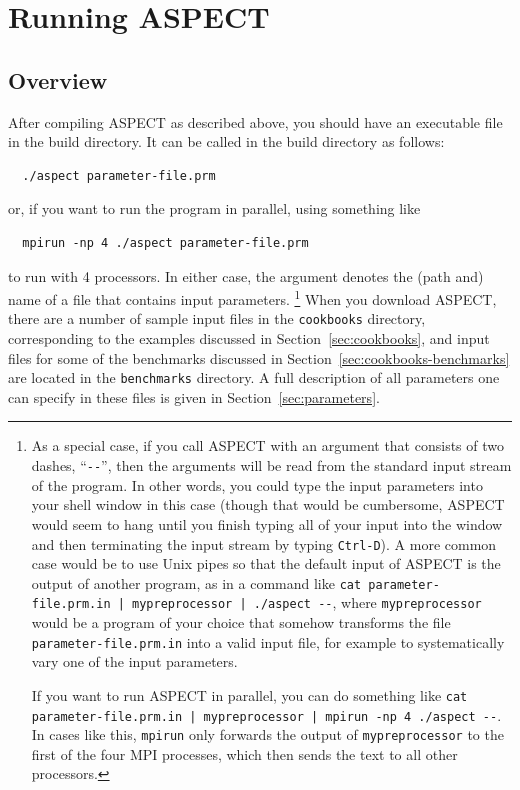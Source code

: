 \documentclass{article}
\newcommand{\aspect}{\textsc{ASPECT}}
\begin{document}

\section{Running \aspect}
\label{sec:running}

\subsection{Overview}
\label{sec:running-overview}

After compiling \aspect{} as described above, you should have an executable
file in the build directory. It can be called in the build directory as follows:
\begin{verbatim}
  ./aspect parameter-file.prm
\end{verbatim}
or, if you want to run the program in parallel, using something like
\begin{verbatim}
  mpirun -np 4 ./aspect parameter-file.prm
\end{verbatim}
to run with 4 processors. In either case, the argument denotes the (path and)
name of a file that contains input parameters.%
\footnote{As a special case, if you call \aspect{} with an argument that
consists of two dashes, ``\texttt{-{}-}'', then the arguments will be read from
the standard input stream of the program. In other words, you could type the
input parameters into your shell window in this case (though that would be
cumbersome, \aspect{} would seem to hang until you finish typing all of your
input into the window and then terminating the input stream by typing
\texttt{Ctrl-D}). A more common case would be to use Unix pipes so that the
default 
input of \aspect{} is the output of another program, as in a command like
\texttt{cat parameter-file.prm.in | mypreprocessor | ./aspect -{}-}, where
\texttt{mypreprocessor} would be a program of your choice that somehow
transforms the file \texttt{parameter-file.prm.in} into a valid input file,
for example to systematically vary one of the input parameters.

If you want to run \aspect{} in parallel, you can do something like
\texttt{cat parameter-file.prm.in | mypreprocessor | mpirun -np 4 ./aspect
  -{}-}. In cases like this, \texttt{mpirun} only forwards the output of
\texttt{mypreprocessor} to the first of the four MPI processes, which then
sends the text to all other processors.}
When you download \aspect{}, there are a number of sample input files in the
\texttt{cookbooks} directory, corresponding to the examples discussed in
Section~\ref{sec:cookbooks}, and input files for some of the benchmarks discussed
in Section~\ref{sec:cookbooks-benchmarks} are located in the \texttt{benchmarks}
directory. A full description of all parameters one can specify in these files
is given in Section~\ref{sec:parameters}.
\end{document}
